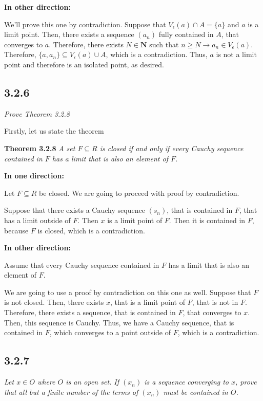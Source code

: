 \documentclass[11pt,oneside,titlepage]{book}
\begin{document}
\textbf{In other direction:}

We'll prove this one by contradiction. Suppose that
$V_\epsilon(a) \cap A = \{a\}$ and $a$ is a limit point. Then, there exists
a sequence $(a_n)$ fully contained in $A$, that converges to $a$. Therefore,
there exists $N \in \textbf{N}$ such that $n \geq N \to a_n \in V_\epsilon(a)$.
Therefore, $\{a, a_n\} \subseteq V_\epsilon(a) \cup A$, which is a
contradiction. Thus, $a$ is not a limit point and therefore is an isolated
point, as desired.

\subsection*{3.2.6}

\textit{Prove Theorem 3.2.8}

Firstly, let us state the theorem

\textbf{Theorem 3.2.8}
\textit{A set $F \subseteq R$ is closed if and only if every Cauchy sequence
  contained in $F$ has a limit that is also an element of $F$. }

\textbf{In one direction:}

Let  $F \subseteq R$ be closed. We are going to proceed with proof by
contradiction.

Suppose that there exists a Cauchy sequence $(s_n)$, that is contained in $F$,
that has a limit outside of $F$. Then $x$ is a limit point of $F$. Then it is
contained in $F$, because $F$ is closed, which is a contradiction.

\textbf{In other direction:}

Assume that every Cauchy sequence  contained in $F$ has a limit
that is also an element of $F$.

We are going to use a proof by contradiction on this one as well. Suppose that
$F$ is not closed. Then, there exists $x$, that is a limit point of $F$, that
is not in $F$. Therefore, there exists a sequence, that is contained in $F$,
that converges to $x$. Then, this sequence is Cauchy. Thus, we have a Cauchy
sequence, that is contained in $F$, which converges to a point outside of $F$,
which is a contradiction.

\subsection*{3.2.7}
\textit{Let $x \in O$ where $O$ is an open set. If $(x_n)$ is a sequence
  converging to $x$, prove that all but a finite number of the terms of
  $(x_n)$ must be contained in $O$. }
\end{document}
